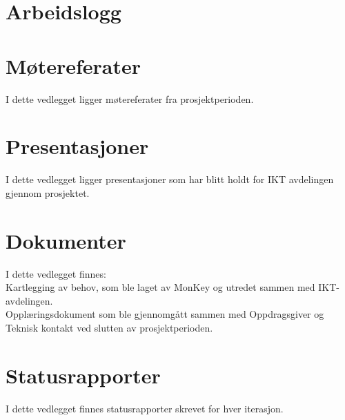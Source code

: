 \documentclass[a4paper,twoside,11pt,pdftex,norsk]{report}
\newcounter{includepdfpage}
\newcounter{currentpagecounter}
\newcommand{\addlabelstoallincludedpages}[1]{
   \refstepcounter{includepdfpage}
   \stepcounter{currentpagecounter}
	\appendix
   \label{#1.\thecurrentpagecounter}}
\newcommand{\modifiedincludepdf}[3]{
    \setcounter{currentpagecounter}{0}
    }
\begin{document}
\pagestyle{plain}
\begin{appendices}
\clearpage
\chapter{Arbeidslogg}\label{app:arbeidslogg}


\chapter{Møtereferater}\label{app:motereferat}
I dette vedlegget ligger møtereferater fra prosjektperioden.


\chapter{Presentasjoner}\label{app:presentasjoner}
I dette vedlegget ligger presentasjoner som har blitt holdt for IKT avdelingen gjennom prosjektet.




\chapter{Dokumenter}\label{app:dokumenter}
I dette vedlegget finnes:\\ 
\indent Kartlegging av behov, som ble laget av MonKey og utredet sammen med IKT-avdelingen.\\
\indent Opplæringsdokument som ble gjennomgått sammen med Oppdragsgiver og Teknisk kontakt ved slutten av prosjektperioden.




\chapter{Statusrapporter}\label{app:statusrapporter}
I dette vedlegget finnes statusrapporter skrevet for hver iterasjon.









\end{appendices}
\end{document}
